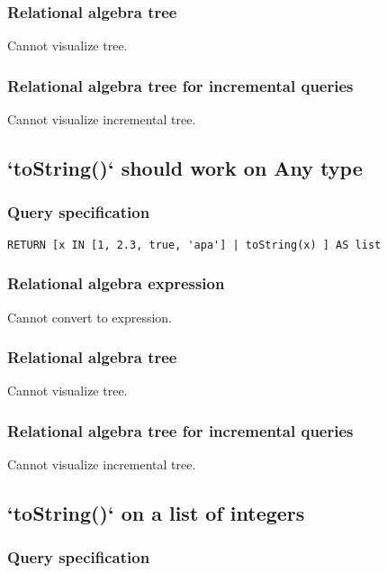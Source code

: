 \subsubsection*{Relational algebra tree}

Cannot visualize tree.

\subsubsection*{Relational algebra tree for incremental queries}

Cannot visualize incremental tree.

\subsection{`toString()` should work on Any type}

\subsubsection*{Query specification}

\begin{lstlisting}
RETURN [x IN [1, 2.3, true, 'apa'] | toString(x) ] AS list
\end{lstlisting}

\subsubsection*{Relational algebra expression}

Cannot convert to expression.

\subsubsection*{Relational algebra tree}

Cannot visualize tree.

\subsubsection*{Relational algebra tree for incremental queries}

Cannot visualize incremental tree.

\subsection{`toString()` on a list of integers}

\subsubsection*{Query specification}

